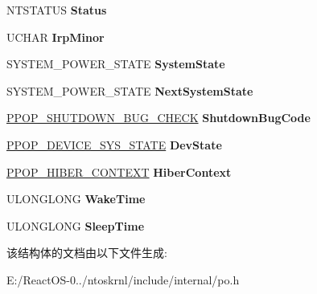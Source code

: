 \begin{DoxyCompactItemize}
N\+T\+S\+T\+A\+T\+US {\bfseries Status}
\item 
\mbox{\label{struct___p_o_p___p_o_w_e_r___a_c_t_i_o_n_a686fb8296104876efe553e52e6d4c740}} 
U\+C\+H\+AR {\bfseries Irp\+Minor}
\item 
\mbox{\label{struct___p_o_p___p_o_w_e_r___a_c_t_i_o_n_a5424a8807d0d0063814b43d70cea7948}} 
S\+Y\+S\+T\+E\+M\+\_\+\+P\+O\+W\+E\+R\+\_\+\+S\+T\+A\+TE {\bfseries System\+State}
\item 
\mbox{\label{struct___p_o_p___p_o_w_e_r___a_c_t_i_o_n_a11afab2798e98a3569a0484f820e4dc4}} 
S\+Y\+S\+T\+E\+M\+\_\+\+P\+O\+W\+E\+R\+\_\+\+S\+T\+A\+TE {\bfseries Next\+System\+State}
\item 
\mbox{\label{struct___p_o_p___p_o_w_e_r___a_c_t_i_o_n_a2dc4dfc570322f72440d95b3ba2b23da}} 
\hyperlink{struct___p_o_p___s_h_u_t_d_o_w_n___b_u_g___c_h_e_c_k}{P\+P\+O\+P\+\_\+\+S\+H\+U\+T\+D\+O\+W\+N\+\_\+\+B\+U\+G\+\_\+\+C\+H\+E\+CK} {\bfseries Shutdown\+Bug\+Code}
\item 
\mbox{\label{struct___p_o_p___p_o_w_e_r___a_c_t_i_o_n_a30caeaae331e2932f75836d138803bac}} 
\hyperlink{struct___p_o_p___d_e_v_i_c_e___s_y_s___s_t_a_t_e}{P\+P\+O\+P\+\_\+\+D\+E\+V\+I\+C\+E\+\_\+\+S\+Y\+S\+\_\+\+S\+T\+A\+TE} {\bfseries Dev\+State}
\item 
\mbox{\label{struct___p_o_p___p_o_w_e_r___a_c_t_i_o_n_ad0201f885c75f206ff2a572f87402ba3}} 
\hyperlink{struct___p_o_p___h_i_b_e_r___c_o_n_t_e_x_t}{P\+P\+O\+P\+\_\+\+H\+I\+B\+E\+R\+\_\+\+C\+O\+N\+T\+E\+XT} {\bfseries Hiber\+Context}
\item 
\mbox{\label{struct___p_o_p___p_o_w_e_r___a_c_t_i_o_n_a93c60e8ece38498a4d8f60bd621f2be6}} 
U\+L\+O\+N\+G\+L\+O\+NG {\bfseries Wake\+Time}
\item 
\mbox{\label{struct___p_o_p___p_o_w_e_r___a_c_t_i_o_n_a066a3e59d7722b00aa05f17ed2368e2f}} 
U\+L\+O\+N\+G\+L\+O\+NG {\bfseries Sleep\+Time}
\end{DoxyCompactItemize}


该结构体的文档由以下文件生成\+:\begin{DoxyCompactItemize}
\item 
E\+:/\+React\+O\+S-\/0../ntoskrnl/include/internal/po.\+h\end{DoxyCompactItemize}
